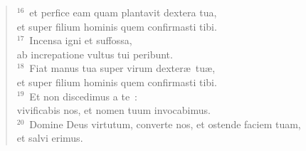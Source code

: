 \begin{flushleft}
\begin{verse}
${}^{16}$~et perfice eam quam plantavit dextera tua,\\ et super filium hominis quem confirmasti tibi.\\
${}^{17}$~Incensa igni et suffossa,\\ ab increpatione vultus tui peribunt.\\
${}^{18}$~Fiat manus tua super virum dexter\ae\ tu\ae ,\\ et super filium hominis quem confirmasti tibi.\\
${}^{19}$~Et non discedimus a te~:\\ vivificabis nos, et nomen tuum invocabimus.\\
${}^{20}$~Domine Deus virtutum, converte nos, et ostende faciem tuam,\\ et salvi erimus.\end{verse}\end{flushleft}



